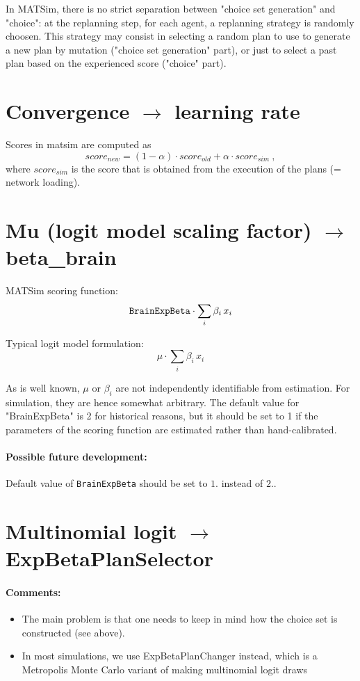 In MATSim, there is no strict separation between "choice set  generation" and "choice": at the replanning step, for each agent, a  replanning strategy is randomly choosen. This strategy may consist in  selecting a random plan to use to generate a new plan by mutation  ("choice set generation" part), or just to select a past plan based on  the experienced score ("choice" part).

\section{Convergence $\to$ learning rate}

Scores in matsim are computed as
\[
score_{new} = (1-\alpha) \cdot score_{old} +   \alpha \cdot score_{sim} \ , 
\]
where $score_{sim}$ is the score that is obtained from   the execution of the plans (= network loading).

\section{Mu (logit model scaling factor) $\to$ beta\_brain}


MATSim scoring function: 
\[
{\tt BrainExpBeta} \cdot \sum_i \beta_i \, x_i
\]

Typical logit model formulation: 
\[
\mu \cdot \sum_i \beta_i \, x_i
\]

As is well known, $\mu$ or $\beta_i$ are not independently
identifiable from estimation. For simulation, they are hence somewhat
arbitrary. The default value for "BrainExpBeta" is 2 for historical
reasons, but it should be set to 1 if the parameters of the scoring
function are estimated rather than hand-calibrated.

\paragraph{Possible future development:}

Default value of \verb$BrainExpBeta$ should be set to $1.$ instead of $2.$.


\section{Multinomial logit $\to$ ExpBetaPlanSelector}


\paragraph{Comments:}
\begin{itemize}
	\item The main problem is that one needs to keep in mind how the choice set is constructed (see above).
	\item In most simulations, we use ExpBetaPlanChanger instead, which is a   Metropolis Monte Carlo variant of making multinomial logit draws
\end{itemize}

